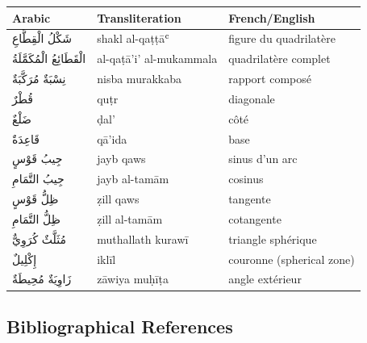 \documentclass[11pt,a4paper]{article}
\theoremstyle{plain}
\theoremstyle{definition}
\theoremstyle{remark}
\newcommand{\ar}[1]{{\arabicfont\beginR #1\endR}}
\begin{document}
\begin{center}

\begin{longtable}{lll}

\toprule

\textbf{Arabic} & \textbf{Transliteration} & \textbf{French/English} \\

\midrule

\endhead

\ar{شَكْلُ الْقِطَّاعِ} & shakl al-qaṭṭāʿ & figure du quadrilatère \\

\ar{الْقَطَائِعُ الْمُكَمَّلَةُ} & al-qaṭā'i' al-mukammala & quadrilatère complet \\

\ar{نِسْبَةٌ مُرَكَّبَةٌ} & nisba murakkaba & rapport composé \\

\ar{قُطْرٌ} & quṭr & diagonale \\

\ar{ضَلْعٌ} & ḍal' & côté \\

\ar{قَاعِدَةٌ} & qā'ida & base \\

\ar{جِيبُ قَوْسٍ} & jayb qaws & sinus d'un arc \\

\ar{جِيبُ التَّمَامِ} & jayb al-tamām & cosinus \\

\ar{ظِلُّ قَوْسٍ} & ẓill qaws & tangente \\

\ar{ظِلُّ التَّمَامِ} & ẓill al-tamām & cotangente \\

\ar{مُثَلَّثٌ كُرَوِيٌّ} & muthallath kurawī & triangle sphérique \\

\ar{إِكْلِيلٌ} & iklīl & couronne (spherical zone) \\

\ar{زَاوِيَةٌ مُحِيطَةٌ} & zāwiya muḥīṭa & angle extérieur \\

\bottomrule

\end{longtable}

\end{center}



\subsection*{Bibliographical References}
\end{document}
